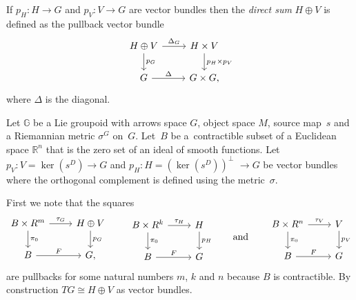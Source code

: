\documentclass[pdftex]{sigma}
\numberwithin{equation}{section}
\begin{document}
\begin{Definition}If $p_H\colon H\rightarrow G$ and $p_V\colon V\rightarrow G$ are vector bundles then the \emph{direct sum} $H\oplus V$ is def\/ined as the pullback vector bundle
\begin{equation*}
\begin{tikzcd}
H\oplus V \dar{p_G} \rar{\Delta_G} & H\times V \dar{p_H\times p_V}\\
G \rar{\Delta} & G\times G,
\end{tikzcd}
\end{equation*}
where $\Delta$ is the diagonal.
\end{Definition}

\begin{Notation}Let $\mathbb{G}$ be a Lie groupoid with arrows space $G$, object space $M$, source map~$s$ and a Riemannian metric $\sigma^G$ on~$G$. Let~$B$ be a~contractible subset of a Euclidean space $\mathbb{R}^n$ that is the zero set of an ideal of smooth functions. Let $p_V\colon V=\ker(s^D)\rightarrow G$ and $p_H\colon H=(\ker(s^D))^{\perp}$ $\rightarrow G$ be vector bundles where the orthogonal complement is def\/ined using the metric~$\sigma$.
\end{Notation}

First we note that the squares
\begin{equation*}
\begin{tikzcd}
B\times R^m \rar{\tau_G} \dar{\pi_0} & H\oplus V \dar{p_G}\\
B \rar{F} & G,
\end{tikzcd}
\qquad
\begin{tikzcd}
B\times R^k \rar{\tau_H} \dar{\pi_0} & H \dar{p_H}\\
B \rar{F} & G
\end{tikzcd}
\qquad \text{and}\qquad
\begin{tikzcd}
B\times R^n \rar{\tau_V} \dar{\pi_0} & V \dar{p_V}\\
B \rar{F} & G
\end{tikzcd}
\end{equation*}
are pullbacks for some natural numbers $m$, $k$ and $n$ because $B$ is contractible. By construction $TG\cong H\oplus V$ as vector bundles.
\end{document}
